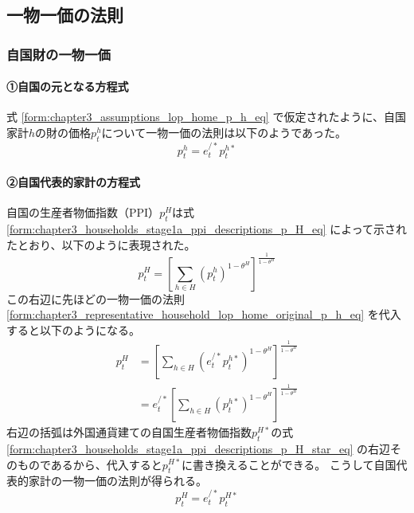 
\subsection{一物一価の法則}
\label{sec:chapter3_representative_household_lop}

\subsubsection{自国財の一物一価}
\label{sec:chapter3_representative_household_lop_home}

\paragraph{①自国の元となる方程式}
\label{sec:chapter3_representative_household_lop_home_original}
式
\eqref{form:chapter3_assumptions_lop_home_p_h_eq}
で仮定されたように、自国家計\(h\)の財の価格\(p_t^h\)について一物一価の法則は以下のようであった。
\begin{equation}
\label{form:chapter3_representative_household_lop_home_original_p_h_eq}
    p_t^h=e_t^{/*}p_t^{h*}
\end{equation}

\paragraph{②自国代表的家計の方程式}
\label{sec:chapter3_representative_household_lop_home_representative}
自国の生産者物価指数（PPI）\(p_t^H\)は式
\eqref{form:chapter3_households_stage1a_ppi_descriptions_p_H_eq}
によって示されたとおり、以下のように表現された。
\begin{equation}
\label{form:chapter3_representative_household_lop_home_representative_p_H_eq}
    p_t^H=\left[\sum_{h\in H}(p_t^h)^{1-\theta^H}\right]^{\frac{1}{1-\theta^H}}
\end{equation}
この右辺に先ほどの一物一価の法則
\eqref{form:chapter3_representative_household_lop_home_original_p_h_eq}
を代入すると以下のようになる。
\begin{equation}
\label{form:chapter3_representative_household_lop_home_representative_p_h_modified_eq}
    \begin{aligned}
        p_t^H&=\left[\sum_{h\in H}(e_t^{/*}p_t^{h*})^{1-\theta^H}\right]^{\frac{1}{1-\theta^H}} \\
        &=e_t^{/*}\left[\sum_{h\in H}(p_t^{h*})^{1-\theta^H}\right]^{\frac{1}{1-\theta^H}}
    \end{aligned}
\end{equation}
右辺の括弧は外国通貨建ての自国生産者物価指数\(p_t^{H*}\)の式
\eqref{form:chapter3_households_stage1a_ppi_descriptions_p_H_star_eq}
の右辺そのものであるから、代入すると\(p_t^{H*}\)に書き換えることができる。
こうして自国代表的家計の一物一価の法則が得られる。
\begin{equation}
\label{form:chapter3_representative_household_lop_home_representative_p_H_eq}
    p_t^H=e_t^{/*}p_t^{H*}
\end{equation}

